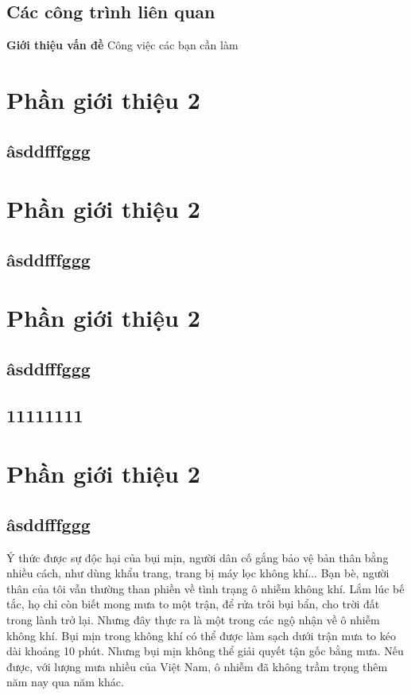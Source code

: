 \documentclass[a4paper]{article}
\begin{document}
	\subsection{Các công trình liên quan}
	\textbf{ Giới thiệu vấn đề}
	Công việc các bạn cần làm

 \section{Phần giới thiệu 2}
    \subsection{âsddfffggg}

 \section{Phần giới thiệu 2}
    \subsection{âsddfffggg}

\section{Phần giới thiệu 2}
    \subsection{âsddfffggg}
    
    \subsection{11111111}
    
 \section{Phần giới thiệu 2}
    \subsection{âsddfffggg}
    Ý thức được sự độc hại của bụi mịn, người dân cố gắng bảo vệ bản thân bằng nhiều cách, như dùng khẩu trang, trang bị máy lọc không khí... Bạn bè, người thân của tôi vẫn thường than phiền về tình trạng ô nhiễm không khí. Lắm lúc bế tắc, họ chỉ còn biết mong mưa to một trận, để rửa trôi bụi bẩn, cho trời đất trong lành trở lại. Nhưng đây thực ra là một trong các ngộ nhận về ô nhiễm không khí. Bụi mịn trong không khí có thể được làm sạch dưới trận mưa to kéo dài khoảng 10 phút. Nhưng bụi mịn không thể giải quyết tận gốc bằng mưa. Nếu được, với lượng mưa nhiều của Việt Nam, ô nhiễm đã không trầm trọng thêm năm nay qua năm khác.
\end{document}

